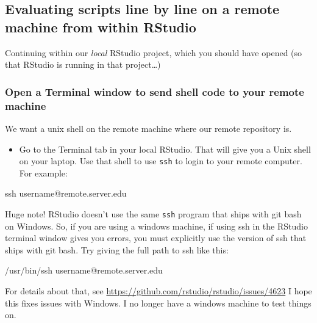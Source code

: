 \documentclass[]{krantz}
\makeatletter
\newenvironment{Shaded}{\begin{snugshade}}{\end{snugshade}}
\newcommand{\ExtensionTok}[1]{#1}
\newcommand{\FunctionTok}[1]{\textcolor[rgb]{0,0,0}{#1}}
\newcommand{\NormalTok}[1]{#1}
\providecommand{\tightlist}{%
  \setlength{\itemsep}{0pt}\setlength{\parskip}{0pt}}
\newenvironment{kframe}{%
\medskip{}
\setlength{\fboxsep}{.8em}
 \def\at@end@of@kframe{}%
 \ifinner\ifhmode%
  \def\at@end@of@kframe{\end{minipage}}%
  \begin{minipage}{\columnwidth}%
 \fi\fi%
 \def\FrameCommand##1{\hskip\@totalleftmargin \hskip-\fboxsep
 \colorbox{shadecolor}{##1}\hskip-\fboxsep
     \hskip-\linewidth \hskip-\@totalleftmargin \hskip\columnwidth}%
 \MakeFramed {\advance\hsize-\width
   \@totalleftmargin\z@ \linewidth\hsize
   \@setminipage}}%
 {\par\unskip\endMakeFramed%
 \at@end@of@kframe}
\renewenvironment{Shaded}{\begin{kframe}}{\end{kframe}}
\makeatother
\begin{document}
\hypertarget{evaluating-scripts-line-by-line-on-a-remote-machine-from-within-rstudio}{%
\subsection{Evaluating scripts line by line on a remote machine from within RStudio}\label{evaluating-scripts-line-by-line-on-a-remote-machine-from-within-rstudio}}

Continuing within our \emph{local} RStudio project, which you should have opened (so
that RStudio is running in that project\ldots{})

\hypertarget{open-a-terminal-window-to-send-shell-code-to-your-remote-machine}{%
\subsubsection{Open a Terminal window to send shell code to your remote machine}\label{open-a-terminal-window-to-send-shell-code-to-your-remote-machine}}

We want a unix shell on the remote machine where our remote repository is.

\begin{itemize}
\tightlist
\item
  Go to the Terminal tab in your local RStudio. That will give you a Unix shell
  on your laptop. Use that shell to use \texttt{ssh} to login to your remote computer.
  For example:
\end{itemize}

\begin{Shaded}
\begin{Highlighting}[]
\FunctionTok{ssh}\NormalTok{ username@remote.server.edu}
\end{Highlighting}
\end{Shaded}

Huge note! RStudio doesn't use the same \texttt{ssh} program that ships with git bash on
Windows. So, if you are using a windows machine, if using ssh in the RStudio terminal
window gives you errors, you must explicitly use the version of ssh that ships with git
bash. Try giving the full path to ssh like this:

\begin{Shaded}
\begin{Highlighting}[]
\ExtensionTok{/usr/bin/ssh}\NormalTok{ username@remote.server.edu}
\end{Highlighting}
\end{Shaded}

For details about that, see \url{https://github.com/rstudio/rstudio/issues/4623} I hope this fixes issues with Windows. I no longer have a windows machine
to test things on.
\end{document}
